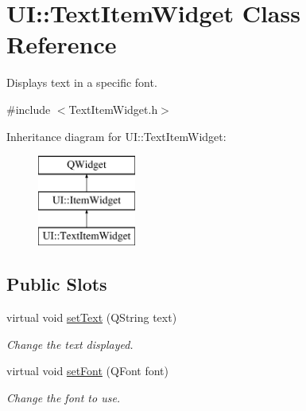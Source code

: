 \hypertarget{class_u_i_1_1_text_item_widget}{\section{U\-I\-:\-:Text\-Item\-Widget Class Reference}
\label{class_u_i_1_1_text_item_widget}
}


Displays text in a specific font.  




{\ttfamily \#include $<$Text\-Item\-Widget.\-h$>$}

Inheritance diagram for U\-I\-:\-:Text\-Item\-Widget\-:\begin{figure}[H]
\begin{center}
\leavevmode
\includegraphics[height=3.000000cm]{class_u_i_1_1_text_item_widget}
\end{center}
\end{figure}
\subsection*{Public Slots}
\begin{DoxyCompactItemize}
\item 
virtual void \hyperlink{class_u_i_1_1_text_item_widget_a0065803717112ed4464026eeb8a0e711}{set\-Text} (Q\-String text)
\begin{DoxyCompactList}\small\item\em Change the text displayed. \end{DoxyCompactList}\item 
virtual void \hyperlink{class_u_i_1_1_text_item_widget_ad11b1e1f787bb0c99cca45a8931b3edc}{set\-Font} (Q\-Font font)
\begin{DoxyCompactList}\small\item\em Change the font to use. \end{DoxyCompactList}\end{DoxyCompactItemize}
